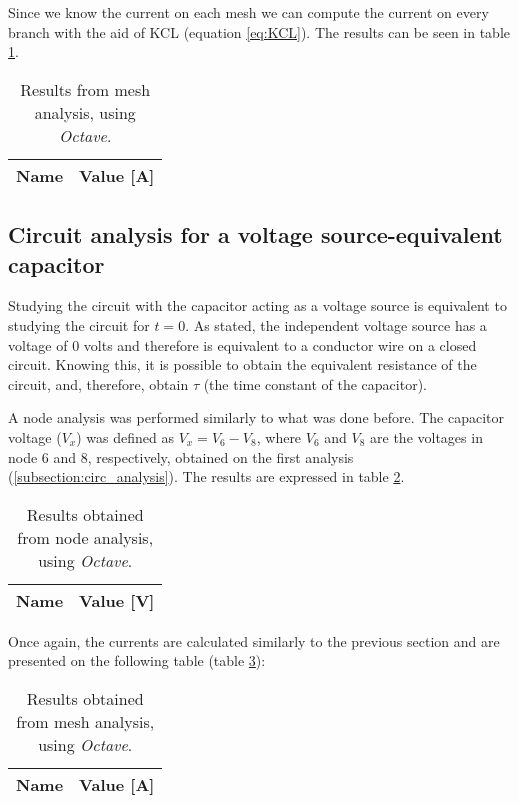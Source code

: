 Since we know the current on each mesh we can compute the current on every branch with the aid of KCL (equation \ref{eq:KCL}). The results can be seen in table \ref{tab:Bcurrents}. 

\begin{table}[H]
  \centering
  \begin{tabular}{|l|r|}
    \hline    
    {\bf Name} & {\bf Value [A]} \\ \hline
    
  \end{tabular}
  \caption{Results from mesh analysis, using \textit{Octave}.}
  \label{tab:Bcurrents}
\end{table}


\subsection{Circuit analysis for a voltage source-equivalent capacitor}

\indent

Studying the circuit with the capacitor acting as a voltage source is equivalent to studying the circuit for $t=0$. As stated, the independent voltage source has a voltage of 0 volts and therefore is equivalent to a conductor wire on a closed circuit. Knowing this, it is possible to obtain the equivalent resistance of the circuit, and, therefore, obtain $\tau$ (the time constant of the capacitor).

A node analysis was performed similarly to what was done before. The capacitor voltage ($V_x$) was defined as $V_x = V_6-V_8$, where $V_6$ and $V_8$ are the voltages in node 6 and 8, respectively, obtained on the first analysis (\ref{subsection:circ_analysis}). The results are expressed in table \ref{tab:Volts2}.


\begin{table}[H]
  \centering
  \begin{tabular}{|l|r|}
    \hline    
    {\bf Name} & {\bf Value [V]} \\ \hline
    
  \end{tabular}
  \caption{Results obtained from node analysis, using \textit{Octave}.}
  \label{tab:Volts2}
\end{table}

Once again, the currents are calculated similarly to the previous section and are presented on the following table (table \ref{tab:Bcurrents2}):

\begin{table}[H]
  \centering
  \begin{tabular}{|l|r|}
    \hline    
    {\bf Name} & {\bf Value [A]} \\ \hline
    
  \end{tabular}
  \caption{Results obtained from mesh analysis, using \textit{Octave}.}
  \label{tab:Bcurrents2}
\end{table}


